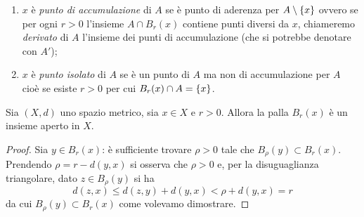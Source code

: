 \begin{definition}
\begin{enumerate}
%
\item
$x$ è \emph{punto di accumulazione}%
%
 di $A$ se
è punto di aderenza per $A \setminus {\left\{ x \right\}}$ ovvero se
per ogni $r>0$ l'insieme $A \cap B_r(x)$ contiene punti diversi da $x$, chiameremo \emph{derivato}%
 di $A$ l'insieme dei punti di accumulazione (che si potrebbe denotare con $A'$);
\item
$x$ è \emph{punto isolato}%
 di $A$ se è un punto di $A$ ma non di accumulazione per $A$ cioè se esiste $r>0$ per cui
$B_r(x) \cap A = {\left\{ x \right\}}$.
\end{enumerate}
\end{definition}

\begin{theorem}
Sia $(X,d)$ uno spazio metrico, sia $x\in X$ e $r>0$. Allora la palla $B_r(x)$ è un insieme aperto in $X$.
\end{theorem}
%
\begin{proof}
Sia $y\in B_r(x)$: è sufficiente trovare $\rho>0$ tale che $B_\rho(y) \subset B_r(x)$. Prendendo $\rho = r-d(y,x)$ si osserva che $\rho >0 $ e, per la disuguaglianza triangolare,
dato $z \in B_\rho(y)$ si ha
\[
  d(z,x) \le d(z,y) + d(y,x) < \rho + d(y,x) = r
\]
da cui $B_\rho(y)\subset B_r(x)$ come volevamo dimostrare.
\end{proof}

